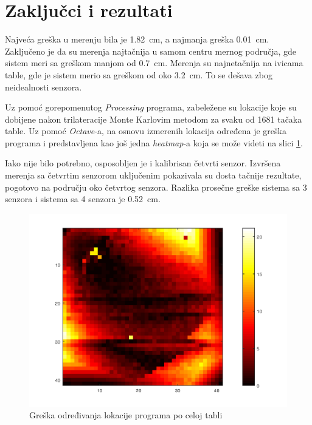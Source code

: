 \documentclass{article}
\begin{document}
\section{Zaključci i rezultati}
    Najveća greška u merenju bila je \SI{1.82}{\cm}, a najmanja greška \SI{0.01}{\cm}. Zaključeno je da su merenja najtačnija u samom centru mernog područja, gde sistem meri sa greškom manjom od \SI{0.7}{\cm}. Merenja su najnetačnija na ivicama table, gde je sistem merio sa greškom od oko \SI{3.2}{\cm}. To se dešava zbog neidealnosti senzora.

    Uz pomoć gorepomenutog \textit{Processing} programa, zabeležene su lokacije koje su dobijene nakon trilateracije Monte Karlovim metodom za svaku od 1681 tačaka table. Uz pomoć \textit{Octave}-a, na osnovu izmerenih lokacija određena je greška programa i predstavljena kao još jedna \textit{heatmap}-a koja se može videti na slici \ref{Merenje}.


    Iako nije bilo potrebno, osposobljen je i kalibrisan četvrti senzor. Izvršena merenja sa četvrtim senzorom uključenim pokazivala su dosta tačnije rezultate, pogotovo na području oko četvrtog senzora. Razlika prosečne greške sistema sa 3 senzora i sistema sa 4 senzora je \SI{0.52}{\cm}.

    \begin{figure}[H]
        \centering
        \includegraphics[scale=0.3]{merenje.png}
        \caption{Greška određivanja lokacije programa po celoj tabli}
        \label{Merenje}
    \end{figure}
\end{document}
